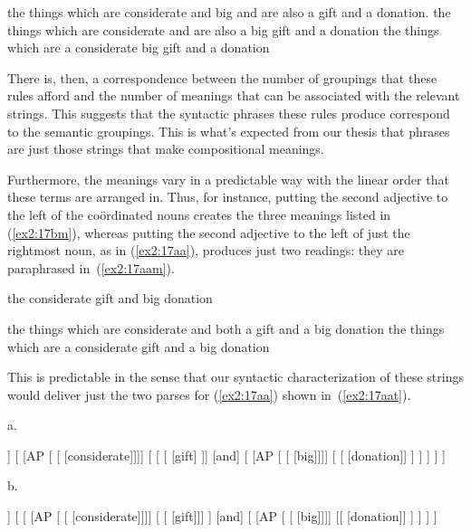 \pagebreak
\begin{exe}
	\ex \label{ex2:17bm}
	\begin{xlist}
	\ex the things which are considerate and big and are also a gift and a donation.
	\ex the things which are considerate and are also a big gift and a donation
	\ex the things which are a considerate big gift and a donation
	\end{xlist} 
\end{exe}
There is, then, a correspondence between the number of groupings that these rules afford and the number of meanings that can be associated with the relevant strings. This suggests that the syntactic phrases these rules produce correspond to the semantic groupings. This is what's expected from our thesis that phrases are just those strings that make compositional meanings. 

Furthermore, the meanings vary in a predictable way with the linear order that these terms are arranged in. Thus, for instance, putting the second adjective to the left of the co\"ordinated nouns creates the three meanings listed in (\ref{ex2:17bm}), whereas putting the second adjective to the left of just the rightmost noun, as in (\ref{ex2:17aa}), produces just two readings: they are paraphrased in~(\ref{ex2:17aam}).
\begin{exe}
	\ex \label{ex2:17aa} the considerate gift and big donation
	\ex \label{ex2:17aam}
	\begin{xlist}
	\ex the things which are considerate and both a gift and a big donation
	\ex the things which are a considerate gift and a big donation
	\end{xlist} 
\end{exe}
This is predictable in the sense that our syntactic characterization of these strings would deliver just the two parses for (\ref{ex2:17aa}) shown in~(\ref{ex2:17aat}).
\begin{exe}
	\ex \label{ex2:17aat}
	a.
	\small 
\begin{forest}
[NP
	[\obar{D} [the]]
	[ 
		[AP [ [ [considerate]]]]
		[ 
			[ [ [gift] ]]
			[and]
			[
				[AP [ [ [big]]]]
				[ [ [donation]] ]
			 ]
		]
	]
]
\end{forest}
\hspace*{10pt}
b.
\begin{forest}
[NP
	[\obar{D} [the]]
	[ 
		[
			[AP [ [ [considerate]]]]
			[ [ [gift]]]
		 ]
		[and]
		[
			[AP [ [ [big]]]]
			[[ [donation]] ]
		]
	]
]
\end{forest}
\end{exe}

